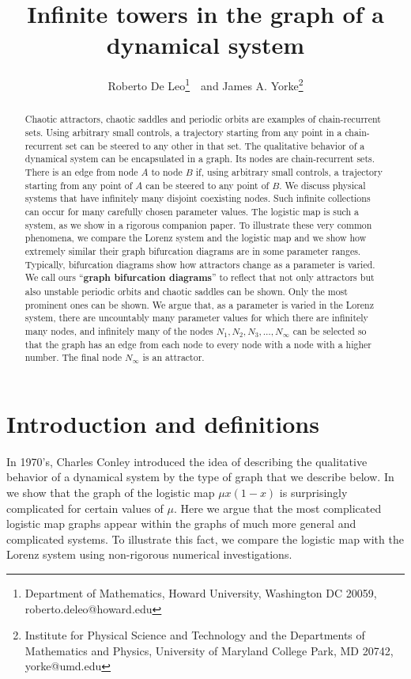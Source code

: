\documentclass{article}
\title{
Infinite towers in the graph of a dynamical system
}
\author{Roberto De Leo\thanks{Department of Mathematics, Howard University, Washington DC 20059, roberto.deleo@howard.edu}\ \ and James A. Yorke\thanks{Institute for Physical Science and Technology and the Departments of Mathematics and Physics, University of Maryland College Park, MD 20742, yorke@umd.edu}}
\newcommand{\jim}{\color{black} }
\begin{document}
\maketitle
%


\begin{abstract}
 Chaotic attractors, chaotic saddles and periodic orbits are examples of chain-recurrent sets. 
  Using arbitrary small controls, a trajectory starting from any point in a chain-recurrent set can be steered to any other in that set. 
 The qualitative behavior of a dynamical system can be encapsulated in a graph. Its nodes are chain-recurrent sets. There is an edge from node $A$ to node $B$ if, using arbitrary small controls, a trajectory starting from any point of $A$ can be steered to any point of $B$. 
 We discuss physical systems that have infinitely many disjoint coexisting nodes. 
 Such infinite collections can occur for many carefully chosen parameter values. The logistic map is such a system, as we show in a rigorous companion paper. 
 To illustrate these very common phenomena, we compare the Lorenz system and the logistic map and 
 we show how extremely similar their {\jim graph} bifurcation diagrams are in some parameter ranges. {\jim
 Typically, bifurcation diagrams show how attractors change as a parameter is varied. 
 We call ours ``{\bf graph bifurcation diagrams}'' to reflect that not only attractors but also unstable periodic orbits and chaotic saddles can be shown. 
 Only the most prominent ones can be shown.
 We argue that, as a parameter is varied in the Lorenz system, there are uncountably many parameter values for which there are infinitely many nodes, and infinitely many of the nodes  $N_1,N_2,N_3,\ldots,N_\infty$ can be selected so that the graph has an edge from each node to every node with a node with a higher number. The final node $N_\infty$ is an attractor}.
\end{abstract}
%
\newpage
\section{Introduction and definitions}
%

In 1970's, 
Charles Conley introduced the idea of describing the qualitative behavior of a dynamical system by the type of graph that we describe below. 
In~\cite{DLY20} we show that the graph of the logistic map $\mu x(1-x)$ is surprisingly complicated for certain values of $\mu$. Here we argue that the most complicated logistic map graphs appear within the graphs of much more general and complicated systems. 
To illustrate this fact, we compare the logistic map with the Lorenz system {\jim using non-rigorous numerical investigations.}
\end{document}
